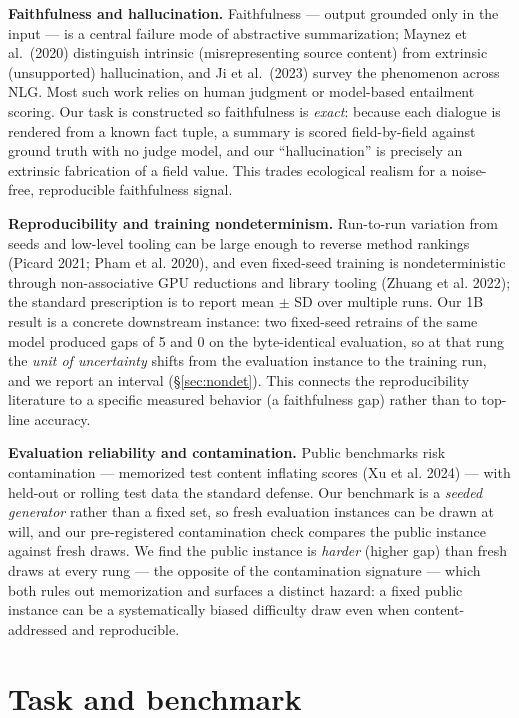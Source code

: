 \documentclass[11pt]{article}
\begin{document}
\textbf{Faithfulness and hallucination.} Faithfulness --- output grounded only in the input --- is a central failure mode of abstractive summarization; Maynez et al.~(2020) distinguish intrinsic (misrepresenting source content) from extrinsic (unsupported) hallucination, and Ji et al.~(2023) survey the phenomenon across NLG. Most such work relies on human judgment or model-based entailment scoring. Our task is constructed so faithfulness is \emph{exact}: because each dialogue is rendered from a known fact tuple, a summary is scored field-by-field against ground truth with no judge model, and our ``hallucination'' is precisely an extrinsic fabrication of a field value. This trades ecological realism for a noise-free, reproducible faithfulness signal.

\textbf{Reproducibility and training nondeterminism.} Run-to-run variation from seeds and low-level tooling can be large enough to reverse method rankings (Picard 2021; Pham et al. 2020), and even fixed-seed training is nondeterministic through non-associative GPU reductions and library tooling (Zhuang et al. 2022); the standard prescription is to report mean $\pm$ SD over multiple runs. Our 1B result is a concrete downstream instance: two fixed-seed retrains of the same model produced gaps of 5 and 0 on the byte-identical evaluation, so at that rung the \emph{unit of uncertainty} shifts from the evaluation instance to the training run, and we report an interval (\S\ref{sec:nondet}). This connects the reproducibility literature to a specific measured behavior (a faithfulness gap) rather than to top-line accuracy.

\textbf{Evaluation reliability and contamination.} Public benchmarks risk contamination --- memorized test content inflating scores (Xu et al. 2024) --- with held-out or rolling test data the standard defense. Our benchmark is a \emph{seeded generator} rather than a fixed set, so fresh evaluation instances can be drawn at will, and our pre-registered contamination check compares the public instance against fresh draws. We find the public instance is \emph{harder} (higher gap) than fresh draws at every rung --- the opposite of the contamination signature --- which both rules out memorization and surfaces a distinct hazard: a fixed public instance can be a systematically biased difficulty draw even when content-addressed and reproducible.

\section{Task and benchmark}\label{sec:task}
\end{document}
